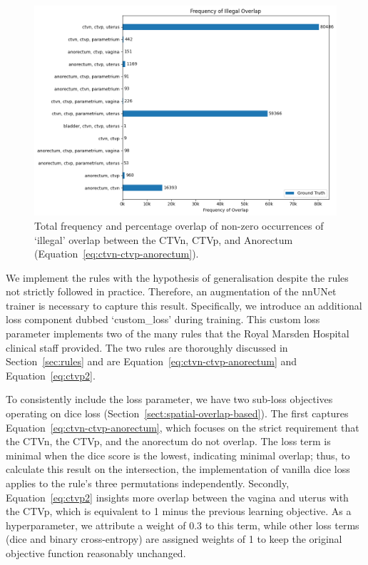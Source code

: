 \documentclass[11pt,twoside]{report}
\begin{document}
\begin{figure}[H]
  \centering
  \includegraphics[height=.4\textheight]{../../research/source/code/nnUNet/3_gt_engineering/illegal_overlap_ground_truth.png}
  \caption{Total frequency and percentage overlap of non-zero occurrences of `illegal' overlap between the CTVn, CTVp, and Anorectum (Equation~\ref{eq:ctvn-ctvp-anorectum}).}\label{fig:illegal_overlap}
\end{figure}

We implement the rules with the hypothesis of generalisation despite the rules not strictly followed in practice. Therefore, an augmentation of the nnUNet trainer is necessary to capture this result. Specifically, we introduce an additional loss component dubbed `custom\_loss' during training. This custom loss parameter implements two of the many rules that the Royal Marsden Hospital clinical staff provided. The two rules are thoroughly discussed in Section~\ref{sec:rules} and are Equation~\ref{eq:ctvn-ctvp-anorectum} and Equation~\ref{eq:ctvp2}. 

To consistently include the loss parameter, we have two sub-loss objectives operating on dice loss (Section~\ref{sect:spatial-overlap-based}). The first captures Equation~\ref{eq:ctvn-ctvp-anorectum}, which focuses on the strict requirement that the CTVn, the CTVp, and the anorectum do not overlap. The loss term is minimal when the dice score is the lowest, indicating minimal overlap; thus, to calculate this result on the intersection, the implementation of vanilla dice loss applies to the rule's three permutations independently. Secondly, Equation~\ref{eq:ctvp2} insights more overlap between the vagina and uterus with the CTVp, which is equivalent to 1 minus the previous learning objective. As a hyperparameter, we attribute a weight of 0.3 to this term, while other loss terms (dice and binary cross-entropy) are assigned weights of 1 to keep the original objective function reasonably unchanged.
\end{document}
